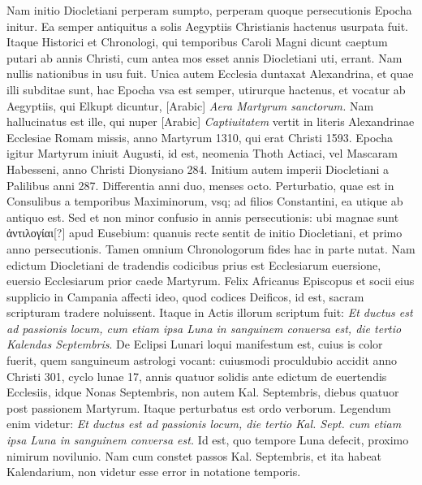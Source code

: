 %
Nam initio Diocletiani perperam sumpto, perperam quoque
persecutionis Epocha initur.
Ea semper antiquitus a solis Aegyptiis
Christianis hactenus usurpata fuit.
Itaque Historici et Chronologi,
qui temporibus Caroli Magni dicunt caeptum putari ab annis
Christi, cum antea mos esset annis Diocletiani uti, errant.
Nam
nullis nationibus in usu fuit.
Unica autem Ecclesia duntaxat Alexandrina,
et quae illi subditae sunt, hac Epocha vsa est semper, utirurque
hactenus, et vocatur ab Aegyptiis, qui Elkupt dicuntur,
\textarabic{}[Arabic] \textit{Aera Martyrum sanctorum.}
Nam
hallucinatus est ille, qui nuper \textarabic{}[Arabic]
\textit{Captiuitatem} vertit in literis
Alexandrinae Ecclesiae Romam missis, anno Martyrum 1310, qui
erat Christi 1593.
Epocha igitur Martyrum iniuit  Augusti,
id est, neomenia Thoth Actiaci, vel Mascaram Habesseni, anno Christi
Dionysiano 284.
Initium autem imperii Diocletiani a Palilibus
anni 287.
Differentia anni duo, menses octo.
Perturbatio, quae est in
Consulibus a temporibus Maximinorum, vsq; ad filios Constantini,
ea utique ab antiquo est.
Sed et non minor confusio in annis persecutionis:
ubi magnae sunt \textgreek{ἀντιλογίαι[?]} apud Eusebium: quanuis
recte sentit de initio Diocletiani, et primo anno persecutionis.
Tamen
omnium Chronologorum fides hac in parte nutat.
Nam edictum
Diocletiani de tradendis codicibus prius est Ecclesiarum euersione,
euersio Ecclesiarum prior caede Martyrum.
Felix Africanus Episcopus
et socii eius supplicio in Campania affecti ideo, quod codices
Deificos, id est, sacram scripturam tradere noluissent.
Itaque in
Actis illorum scriptum fuit: \textit{Et ductus est ad passionis locum, cum etiam
ipsa Luna in sanguinem conuersa est, die tertio Kalendas Septembris}.
De Eclipsi
Lunari loqui manifestum est, cuius is color fuerit, quem sanguineum
astrologi vocant: cuiusmodi proculdubio accidit anno Christi
301, cyclo lunae 17, annis quatuor solidis ante edictum de euertendis
Ecclesiis, idque  Nonas Septembris, non autem  Kal.
Septembris, diebus quatuor post passionem Martyrum.
Itaque perturbatus
est ordo verborum.
Legendum enim videtur: \textit{Et ductus est ad passionis
locum, die tertio Kal. Sept. cum etiam ipsa Luna in sanguinem conversa
est.}
Id est, quo tempore Luna defecit, proximo nimirum novilunio.
Nam cum constet passos  Kal. Septembris, et ita habeat
Kalendarium, non videtur esse error in notatione temporis.
